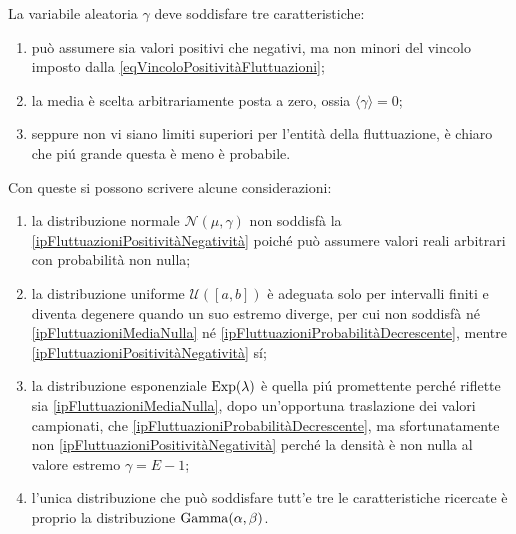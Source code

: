         \begin{ipo}
          \label{ipFluttuazioni}
          La variabile aleatoria \(\gamma\) deve soddisfare tre caratteristiche:

          \begin{enumerate}[
            label=F\arabic*,
          ]
            \item\label{ipFluttuazioniPositivitàNegatività} può assumere sia valori positivi che negativi, ma non minori del vincolo imposto dalla \eqref{eqVincoloPositivitàFluttuazioni};
            \item\label{ipFluttuazioniMediaNulla} la media è scelta arbitrariamente posta a zero, ossia \(\langle\gamma\rangle=0\);
            \item\label{ipFluttuazioniProbabilitàDecrescente} seppure non vi siano limiti superiori per l'entità della fluttuazione, è chiaro che piú grande questa è meno è probabile.
          \end{enumerate}
        \end{ipo}

        Con queste si possono scrivere alcune considerazioni:

        \begin{enumerate}[
          label=\arabic*.,
        ]
          \item la distribuzione normale \(\mathcal N(\mu,\gamma)\) non soddisfà la \ref{ipFluttuazioniPositivitàNegatività} poiché può assumere valori reali arbitrari con probabilità non nulla;
          \item la distribuzione uniforme \(\mathcal U([a,b])\) è adeguata solo per intervalli finiti e diventa degenere quando un suo estremo diverge, per cui non soddisfà né \ref{ipFluttuazioniMediaNulla} né \ref{ipFluttuazioniProbabilitàDecrescente}, mentre \ref{ipFluttuazioniPositivitàNegatività} sí;
          \item la distribuzione esponenziale \(\operatorname{Exp}(\lambda)\) è quella piú promettente perché riflette sia \ref{ipFluttuazioniMediaNulla}, dopo un'opportuna traslazione dei valori campionati, che \ref{ipFluttuazioniProbabilitàDecrescente}, ma sfortunatamente non \ref{ipFluttuazioniPositivitàNegatività} perché la densità è non nulla al valore estremo \(\gamma=E-1\);
          \item l'unica distribuzione che può soddisfare tutt'e tre le caratteristiche ricercate è proprio la distribuzione \(\operatorname{Gamma}(\alpha,\beta)\).
        \end{enumerate}

